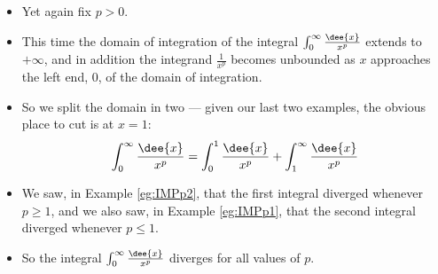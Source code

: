 \begin{eg}\label{eg:IMPp3}
\soln
\begin{itemize}
 \item Yet again fix $p>0$.
\item This time the domain of integration of the integral
$\int_0^\infty\frac{\dee{x}}{x^p}$ extends to $+\infty$, and in addition
the integrand $\frac{1}{x^p}$ becomes unbounded as $x$ approaches
the left end, $0$, of the domain of integration.
\item So we split the domain in two  --- given our last two examples, the obvious
place to cut is at $x=1$:
\begin{equation*}
\int_0^\infty\frac{\dee{x}}{x^p}
=\int_0^1\frac{\dee{x}}{x^p} + \int_1^\infty\frac{\dee{x}}{x^p}
\end{equation*}
\item We saw, in Example \ref{eg:IMPp2}, that the first integral diverged whenever
$p\ge 1$, and we also saw, in Example \ref{eg:IMPp1}, that the second integral
diverged whenever $p\le 1$.
\item So the integral $\int_0^\infty\frac{\dee{x}}{x^p}$
diverges for all values of $p$.
\end{itemize}
\end{eg}

